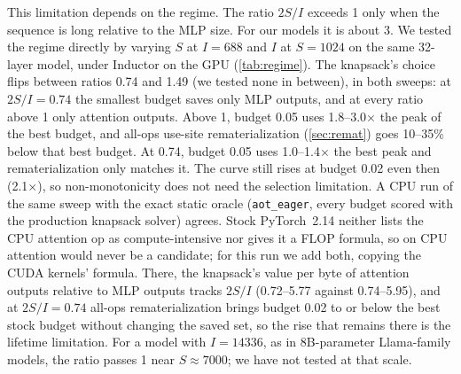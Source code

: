\documentclass[10pt]{article}
\newcommand{\code}[1]{\texttt{#1}}
\begin{document}
This limitation depends on the regime. The ratio $2S/I$ exceeds 1 only when the sequence is long relative to the MLP
size. For our models it is about 3. We tested the regime directly by varying $S$ at $I=688$ and $I$ at $S=1024$ on the same
32-layer model, under Inductor on the GPU (\cref{tab:regime}). The knapsack's choice flips between ratios 0.74 and 1.49 (we tested
none in between), in both sweeps: at $2S/I=0.74$ the smallest budget saves only MLP outputs, and at every ratio above 1 only attention
outputs. Above 1, budget 0.05 uses 1.8--3.0$\times$ the peak of the best budget, and all-ops use-site rematerialization
(\cref{sec:remat}) goes 10--35\% below that best budget. At 0.74, budget 0.05 uses 1.0--1.4$\times$ the best peak and
rematerialization only matches it. The curve still rises at budget 0.02 even then (2.1$\times$), so non-monotonicity does not
need the selection limitation. A CPU run of the same sweep with the exact static oracle (\code{aot\_eager}, every budget
scored with the production knapsack solver) agrees. Stock PyTorch~2.14 neither lists the CPU attention op as compute-intensive
nor gives it a FLOP formula, so on CPU attention would never be a candidate; for this run we add both, copying the CUDA
kernels' formula. There, the knapsack's value per byte of attention outputs relative to MLP
outputs tracks $2S/I$ (0.72--5.77 against 0.74--5.95), and at $2S/I=0.74$ all-ops rematerialization brings budget 0.02 to
or below the best stock budget without changing the saved set, so the rise that remains there is the lifetime limitation.
For a model with $I=14336$, as in 8B-parameter Llama-family models, the ratio passes 1 near $S\approx7000$; we have not
tested at that scale.
\end{document}
